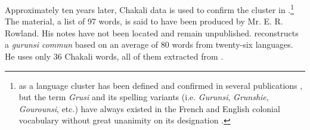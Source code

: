 Approximately ten years later, Chakali data is used to confirm the 
cluster in \citet{Bend65}.\footnote{  as a language cluster 
has been defined and confirmed in several publications \citep{Dela12, Kohl58, 
Bend65, Mane69a, Mane69b, Klei97}, but  the term  {\it Grusi} and its 
spelling variants (i.e. {\it Gurunsi}, {\it Grunshie}, {\it Gourounsi}, etc.)  
have always existed in the French and English colonial vocabulary without great 
unanimity on its designation \citep{Taux21, Taux24, Ratt32a, Ratt32b, Nico52, 
Dupe84}. }  The material, a list of 97 words, is said to have been produced by  
Mr. E. R. Rowland.  His notes have not been located and remain unpublished.  
\citet{Mane69a, Mane69b} reconstructs  a {\it  gurunsi commun}  based on an 
average of 80 words from twenty-six  languages.  He uses  
only 36 Chakali words, all of them extracted from \citet{Bend65}. 

